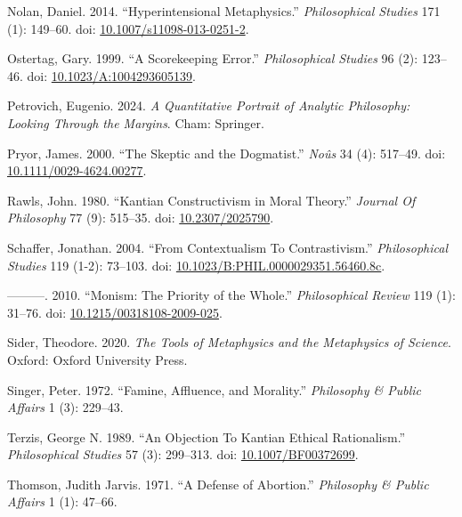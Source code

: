 \documentclass[
  10pt,
  letterpaper,
  DIV=11,
  numbers=noendperiod,
  twoside]{scrartcl}
\newlength{\cslhangindent}
\newenvironment{CSLReferences}[2] %
 {\begin{list}{}{%
  \setlength{\itemindent}{0pt}
  \setlength{\leftmargin}{0pt}
  \setlength{\parsep}{0pt}
  \ifodd #1
   \setlength{\leftmargin}{\cslhangindent}
   \setlength{\itemindent}{-1\cslhangindent}
  \fi
  \setlength{\itemsep}{#2\baselineskip}}}
 {\end{list}}
\begin{document}
\begin{CSLReferences}{1}{0}
Nolan, Daniel. 2014. {``Hyperintensional Metaphysics.''}
\emph{Philosophical Studies} 171 (1): 149--60. doi:
\href{https://doi.org/10.1007/s11098-013-0251-2}{10.1007/s11098-013-0251-2}.

Ostertag, Gary. 1999. {``A Scorekeeping Error.''} \emph{Philosophical
Studies} 96 (2): 123--46. doi:
\href{https://doi.org/10.1023/A:1004293605139}{10.1023/A:1004293605139}.

Petrovich, Eugenio. 2024. \emph{A Quantitative Portrait of Analytic
Philosophy: Looking Through the Margins}. Cham: Springer.

Pryor, James. 2000. {``The Skeptic and the Dogmatist.''} \emph{Noûs} 34
(4): 517--49. doi:
\href{https://doi.org/10.1111/0029-4624.00277}{10.1111/0029-4624.00277}.

Rawls, John. 1980. {``Kantian Constructivism in Moral Theory.''}
\emph{Journal Of Philosophy} 77 (9): 515--35. doi:
\href{https://doi.org/10.2307/2025790}{10.2307/2025790}.

Schaffer, Jonathan. 2004. {``From Contextualism To Contrastivism.''}
\emph{Philosophical Studies} 119 (1-2): 73--103. doi:
\href{https://doi.org/10.1023/B:PHIL.0000029351.56460.8c}{10.1023/B:PHIL.0000029351.56460.8c}.

---------. 2010. {``Monism: The Priority of the Whole.''}
\emph{Philosophical Review} 119 (1): 31--76. doi:
\href{https://doi.org/10.1215/00318108-2009-025}{10.1215/00318108-2009-025}.

Sider, Theodore. 2020. \emph{The Tools of Metaphysics and the
Metaphysics of Science}. Oxford: Oxford University Press.

Singer, Peter. 1972. {``Famine, Affluence, and Morality.''}
\emph{Philosophy \& Public Affairs} 1 (3): 229--43.

Terzis, George N. 1989. {``An Objection To Kantian Ethical
Rationalism.''} \emph{Philosophical Studies} 57 (3): 299--313. doi:
\href{https://doi.org/10.1007/BF00372699}{10.1007/BF00372699}.

Thomson, Judith Jarvis. 1971. {``A Defense of Abortion.''}
\emph{Philosophy \& Public Affairs} 1 (1): 47--66.


\end{CSLReferences}
\end{document}

